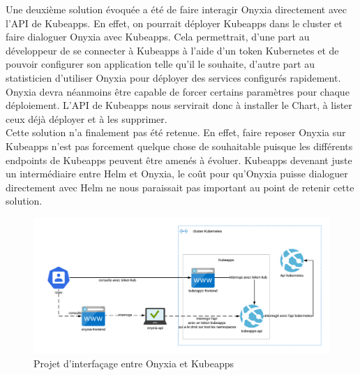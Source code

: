 \documentclass[11pt,fleqn]{book} %
\begin{document}
Une deuxième solution évoquée a été de faire interagir Onyxia directement avec l'API de Kubeapps. En effet, on pourrait déployer Kubeapps dans le cluster et faire dialoguer Onyxia avec Kubeapps. Cela permettrait, d'une part au développeur de se connecter à Kubeapps à l'aide d'un token Kubernetes et de pouvoir configurer son application telle qu'il le souhaite, d'autre part au statisticien d'utiliser Onyxia pour déployer des services configurés rapidement. Onyxia devra néanmoins être capable de forcer certains paramètres pour chaque déploiement. L'API de Kubeapps nous servirait donc à installer le Chart, à lister ceux déjà déployer et à les supprimer. \\

Cette solution n'a finalement pas été retenue. En effet, faire reposer Onyxia sur Kubeapps n'est pas forcement quelque chose de souhaitable puisque les différents endpoints de Kubeapps peuvent être amenés à évoluer. Kubeapps devenant juste un intermédiaire entre Helm et Onyxia, le coût pour qu'Onyxia  puisse dialoguer directement avec Helm ne nous paraissait pas important au point de retenir cette solution.\newpage

\begin{figure}[H]\centering
\renewcommand{\figurename}{Schéma}
\includegraphics[angle=90, scale=1]{Pictures/onyxia/Kubeapps.png}
\captionsetup{margin=1.5cm,format=hang,justification=justified}
\caption[]{Projet d'interfaçage entre Onyxia et Kubeapps \newline}
\end{figure}





\end{document}
